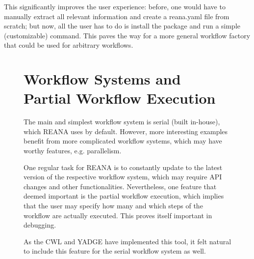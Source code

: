 \noindent
This significantly improves the user experience: before, one would have to manually extract all relevant information and create a reana.yaml file from scratch; but now, all the user has to do is install the package and run a simple (customizable) command. This paves the way for a more general workflow factory that could be used for arbitrary workflows.




\begin{figure}[H]
    \centering
    \begin{minipage}[H]{0.49\textwidth}
\section{Workflow Systems and Partial Workflow Execution}


The main and simplest workflow system is serial (built in-house), which REANA uses by default. However, more interesting examples benefit from more complicated workflow systems, which may have worthy features, e.g.  parallelism.

\vspace{1em}

\noindent
One regular task for REANA is to constantly update to the latest version of the respective workflow system, which may require API changes and other functionalities. Nevertheless, one feature that deemed important is the partial workflow execution, which implies that the user may specify how many and which steps of the workflow are actually executed. This proves itself important in debugging.

\vspace{1em}

\noindent
 As the CWL and YADGE have implemented this tool, it felt natural to include this feature for the serial workflow system as well.


\end{minipage}
\end{figure}
